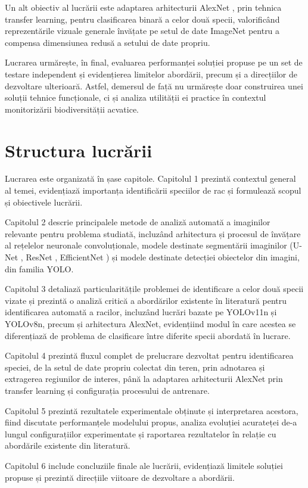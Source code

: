 Un alt obiectiv al lucrării este adaptarea arhitecturii AlexNet \cite{krizhevsky2012imagenet}, prin tehnica transfer learning, pentru clasificarea binară a celor două specii, valorificând reprezentările vizuale generale învățate pe setul de date ImageNet pentru a compensa dimensiunea redusă a setului de date propriu.

Lucrarea urmărește, în final, evaluarea performanței soluției propuse pe un set de testare independent și evidențierea limitelor abordării, precum și a direcțiilor de dezvoltare ulterioară. Astfel, demersul de față nu urmărește doar construirea unei soluții tehnice funcționale, ci și analiza utilității ei practice în contextul monitorizării biodiversității acvatice.

\section{Structura lucrării}

Lucrarea este organizată în șase capitole. Capitolul 1 prezintă contextul general al temei, evidențiază importanța identificării speciilor de rac și formulează scopul și obiectivele lucrării.

Capitolul 2 descrie principalele metode de analiză automată a imaginilor relevante pentru problema studiată, incluzând arhitectura și procesul de învățare al rețelelor neuronale convoluționale, modele destinate segmentării imaginilor (U-Net \cite{ronneberger2015unet}, ResNet \cite{he2016resnet}, EfficientNet \cite{tan2019efficientnet}) și modele destinate detecției obiectelor din imagini, din familia YOLO.

Capitolul 3 detaliază particularitățile problemei de identificare a celor două specii vizate și prezintă o analiză critică a abordărilor existente în literatură pentru identificarea automată a racilor, incluzând lucrări bazate pe YOLOv11n și YOLOv8n, precum și arhitectura AlexNet, evidențiind modul în care acestea se diferențiază de problema de clasificare între diferite specii abordată în lucrare.

Capitolul 4 prezintă fluxul complet de prelucrare dezvoltat pentru identificarea speciei, de la setul de date propriu colectat din teren, prin adnotarea și extragerea regiunilor de interes, până la adaptarea arhitecturii AlexNet prin transfer learning și configurația procesului de antrenare.

Capitolul 5 prezintă rezultatele experimentale obținute și interpretarea acestora, fiind discutate performanțele modelului propus, analiza evoluției acurateței de-a lungul configurațiilor experimentate și raportarea rezultatelor în relație cu abordările existente din literatură.

Capitolul 6 include concluziile finale ale lucrării, evidențiază limitele soluției propuse și prezintă direcțiile viitoare de dezvoltare a abordării.